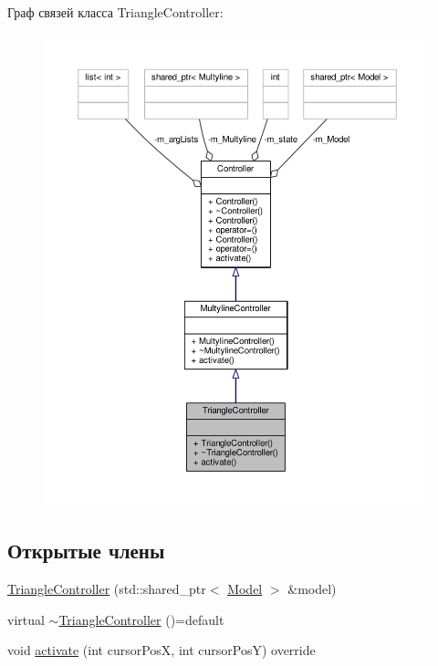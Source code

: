 Граф связей класса Triangle\-Controller\-:
\nopagebreak
\begin{figure}[H]
\begin{center}
\leavevmode
\includegraphics[width=350pt]{class_triangle_controller__coll__graph}
\end{center}
\end{figure}
\subsection*{Открытые члены}
\begin{DoxyCompactItemize}
\item 
\hyperlink{class_triangle_controller_ad6c09eeb592bdd4f9afab1aea1d26921}{Triangle\-Controller} (std\-::shared\-\_\-ptr$<$ \hyperlink{class_model}{Model} $>$ \&model)
\item 
virtual \hyperlink{class_triangle_controller_a5eafaed903ec96ae942bf36cfa5c05d4}{$\sim$\-Triangle\-Controller} ()=default
\item 
void \hyperlink{class_triangle_controller_ab86471e4de39ae99bc6198583d173c7b}{activate} (int cursor\-Pos\-X, int cursor\-Pos\-Y) override
\end{DoxyCompactItemize}



